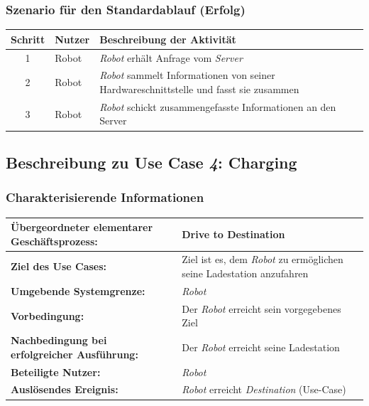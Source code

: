 			\subsubsection*{Szenario für den Standardablauf (Erfolg)}

			\begin{table}[H]
				\centering
				\begin{tabularx}{\textwidth}{|c|p{2cm}|X|}
				\hline
				Schritt & Nutzer & Beschreibung der Aktivität \\ \hline
				1 & Robot & \emph{Robot} erhält Anfrage vom \emph{Server} \\
				2 & Robot & \emph{Robot} sammelt Informationen von seiner Hardwareschnittstelle und fasst sie zusammen \\
				3 & Robot & \emph{Robot} schickt zusammengefasste Informationen an den Server \\
				\hline
				\end{tabularx}
			\end{table}

			
		\pagebreak

		\subsection{Beschreibung zu Use Case \emph{4}: Charging}

			\subsubsection*{Charakterisierende Informationen}

			\begin{table}[H]
				\centering
				\begin{tabularx}{\textwidth}{|p{5cm}|X|}
				\hline
				\textbf{Übergeordneter elementarer Geschäftsprozess:} & Drive to Destination\\ \hline
				\textbf{Ziel des Use Cases:} & Ziel ist es, dem \emph{Robot} zu ermöglichen seine Ladestation anzufahren\\ \hline
				\textbf{Umgebende Systemgrenze:} & \emph{Robot}\\ \hline
				\textbf{Vorbedingung:} & Der \emph{Robot} erreicht sein vorgegebenes Ziel\\ \hline
				\textbf{Nachbedingung bei erfolgreicher Ausführung:} & Der \emph{Robot} erreicht seine Ladestation\\ \hline
				\textbf{Beteiligte Nutzer:} & \emph{Robot}\\ \hline
				\textbf{Auslösendes Ereignis:} & \emph{Robot} erreicht \emph{Destination} (Use-Case)\\
				\hline
				\end{tabularx}
			\end{table}

